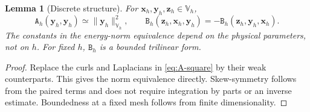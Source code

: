 \documentclass[11pt,a4paper]{article}
\newcommand{\bs}{\boldsymbol}
\newcommand{\V}{\mathbb V}
\newcommand{\DD}{\mathtt D}
\newcommand{\Aform}{\mathtt A}
\newcommand{\JJ}{\mathtt J}
\newcommand{\BB}{\mathtt B}
\newcommand{\CC}{\mathtt C}
\newcommand{\ff}{\mathtt f}
\newcommand{\pp}{\widetilde p}
\newcommand{\dual}[2]{\left\langle#1,#2\right\rangle}
\newtheorem{lemma}[lemma]{Lemma}
\theoremstyle{definition}
\numberwithin{equation}{section}
\begin{document}
\begin{lemma}[Discrete structure]\label{lem:discrete-forms}
For $\bs x_h,\bs y_h,\bs z_h\in\V_h$,
\begin{equation}\label{eq:discrete-structure}
 \Aform_h(\bs y_h,\bs y_h)\simeq\|\bs y_h\|_{\V_h}^2,
 \qquad \BB_h(\bs z_h,\bs x_h,\bs y_h)=-\BB_h(\bs z_h,\bs y_h,\bs x_h).
\end{equation}
The constants in the energy-norm equivalence depend on the physical parameters, not on $h$. For fixed $h$, $\BB_h$ is a bounded trilinear form.
\end{lemma}
\begin{proof}
Replace the curls and Laplacians in \eqref{eq:A-square} by their weak counterparts. This gives the norm equivalence directly. Skew-symmetry follows from the paired terms and does not require integration by parts or an inverse estimate. Boundedness at a fixed mesh follows from finite dimensionality. 
\end{proof}

\end{document}
